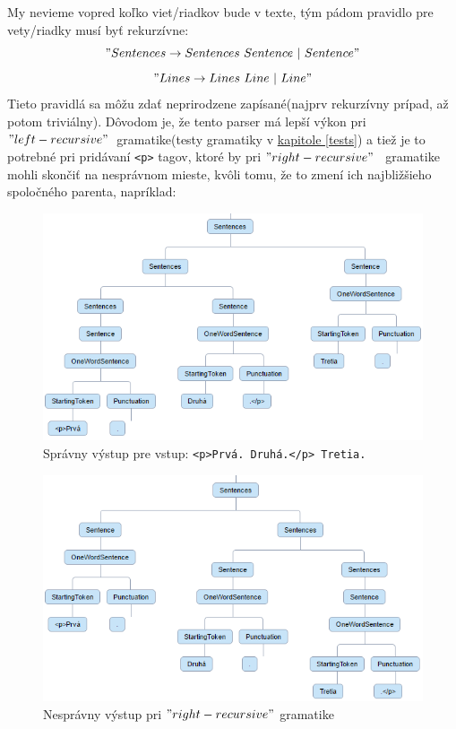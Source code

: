 \documentclass[12pt,a4paper]{report}
\theoremstyle{definition}
\theoremstyle{remark}
\begin{document}
My nevieme vopred koľko viet/riadkov bude v texte, tým pádom pravidlo pre vety/riadky musí byť rekurzívne: $$"Sentences \to Sentences \ Sentence \ | \ Sentence"$$  $$"Lines \to Lines \ Line \ | \ Line"$$
Tieto pravidlá sa môžu zdať neprirodzene zapísané(najprv rekurzívny prípad, až potom triviálny). Dôvodom je, že tento parser má lepší výkon pri $"left-recursive"$\  gramatike(testy gramatiky v \hyperref[tests]{kapitole \ref{tests}}) a tiež je to potrebné pri pridávaní \verb!<p>! tagov, ktoré by pri $"right-recursive"$ \ gramatike mohli skončiť na nesprávnom mieste, kvôli tomu, že to zmení ich najbližšieho spoločného parenta, napríklad:
\begin{figure}[H]

\includegraphics[scale=2.4]{treePTagsCorrect}
\caption{Správny výstup pre vstup: \texttt{<p>Prvá. Druhá.</p> Tretia.}}
\end{figure}
\begin{figure}[H]
\includegraphics[scale=2.4]{treePTagsIncorrect}
\caption{Nesprávny výstup pri $"right-recursive"$ gramatike}
\end{figure}
\end{document}
